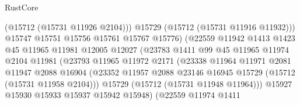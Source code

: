\begin{lexlean}{RustCore}
\begin{coremodule}
                                        (@15712 (@15731 @11926 @2104)))
                                      @15729
                                      (@15712 (@15731 @11916 @11932)))
                                    @15747
                                    @15751
                                    @15756
                                    @15761
                                    @15767
                                    @15776)
                                  (@22559
                                    @11942
                                    @1413
                                    @1423
                                    @45
                                    @11965
                                    @11981
                                    @12005
                                    @12027
                                    (@23783
                                      @1411
                                      @99
                                      @45
                                      @11965
                                      @11974
                                      @2104
                                      @11981
                                      (@23793
                                        @11965
                                        @11972
                                        @2171
                                        (@23338
                                          @11964
                                          @11971
                                          @2081
                                          @11947
                                          @2088
                                          @16904
                                          (@23352
                                            @11957
                                            @2088
                                            @23146
                                            @16945
                                            @15729
                                            (@15712 (@15731 @11958 @2104)))
                                          @15729
                                          (@15712 (@15731 @11948 @11964)))
                                        @15927
                                        @15930
                                        @15933
                                        @15937
                                        @15942
                                        @15948)
                                      (@22559
                                        @11974
                                        @1411

\end{coremodule}
\end{lexlean}

